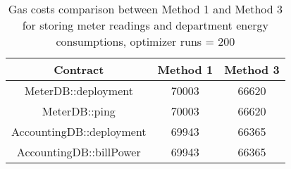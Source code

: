 \begin{table}[htb]
	\centering
	\caption{Gas costs comparison between Method 1 and Method 3 for storing meter readings and department energy consumptions, optimizer runs = 200}
	\vspace*{-1ex}
	\scriptsize
	\vspace{-1ex}
	\begin{tabular}{|c|c|c|}
		\hline
		\textbf{Contract} & \textbf{Method 1} & \textbf{Method 3}\\ \hline
		MeterDB::deployment		 &    70003 &   66620 \\
		MeterDB::ping 			 &    70003 &   66620 \\
        AccountingDB::deployment &    69943 &   66365\\
        AccountingDB::billPower  &    69943 &   66365\\
		\hline
	\end{tabular}
	\vspace{-2ex}
	\label{table:compare-gas}
\end{table}